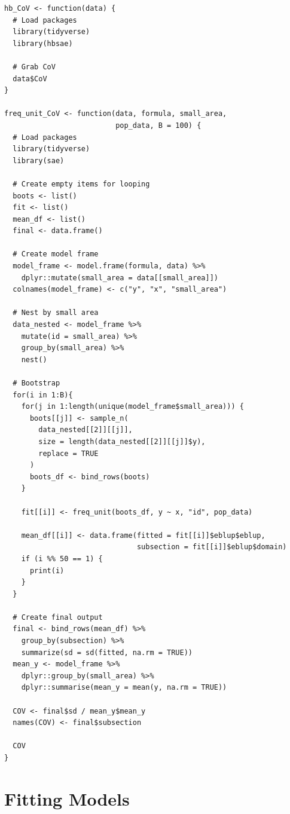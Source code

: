 \documentclass[12pt,twoside]{reedthesis}
\begin{document}
\begin{verbatim}
hb_CoV <- function(data) {
  # Load packages
  library(tidyverse)
  library(hbsae)
  
  # Grab CoV
  data$CoV
}

freq_unit_CoV <- function(data, formula, small_area,
                          pop_data, B = 100) {
  # Load packages
  library(tidyverse)
  library(sae)
  
  # Create empty items for looping
  boots <- list()
  fit <- list()
  mean_df <- list()
  final <- data.frame()
  
  # Create model frame
  model_frame <- model.frame(formula, data) %>%
    dplyr::mutate(small_area = data[[small_area]])
  colnames(model_frame) <- c("y", "x", "small_area")
  
  # Nest by small area
  data_nested <- model_frame %>%
    mutate(id = small_area) %>%
    group_by(small_area) %>%
    nest()
  
  # Bootstrap
  for(i in 1:B){
    for(j in 1:length(unique(model_frame$small_area))) {
      boots[[j]] <- sample_n(
        data_nested[[2]][[j]],
        size = length(data_nested[[2]][[j]]$y),
        replace = TRUE
      )
      boots_df <- bind_rows(boots) 
    }
    
    fit[[i]] <- freq_unit(boots_df, y ~ x, "id", pop_data)
    
    mean_df[[i]] <- data.frame(fitted = fit[[i]]$eblup$eblup,
                               subsection = fit[[i]]$eblup$domain)
    if (i %% 50 == 1) {
      print(i)
    }
  }
  
  # Create final output
  final <- bind_rows(mean_df) %>%
    group_by(subsection) %>%
    summarize(sd = sd(fitted, na.rm = TRUE))
  mean_y <- model_frame %>%
    dplyr::group_by(small_area) %>%
    dplyr::summarise(mean_y = mean(y, na.rm = TRUE))
  
  COV <- final$sd / mean_y$mean_y
  names(COV) <- final$subsection
  
  COV
}
\end{verbatim}
\hypertarget{fitting-models}{%
\section{Fitting Models}\label{fitting-models}}
\end{document}
